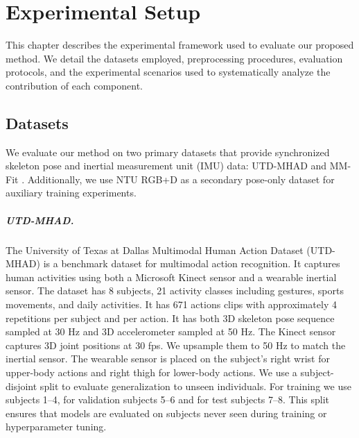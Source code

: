 \chapter{Experimental Setup}
\label{chap:experimental-setup}
{\renewcommand{\thefootnote}{}}

This chapter describes the experimental framework used to evaluate our proposed method. We detail the datasets employed, preprocessing procedures, evaluation protocols, and the experimental scenarios used to systematically analyze the contribution of each component.

\section{Datasets}
\label{sec:datasets}

We evaluate our method on two primary datasets that provide synchronized skeleton pose and inertial measurement unit (IMU) data: UTD-MHAD \cite{chen2015utd} and MM-Fit \cite{stromback2020mm}. Additionally, we use NTU RGB+D \cite{shahroudy2016ntu} as a secondary pose-only dataset for auxiliary training experiments.

\paragraph{UTD-MHAD.}
The University of Texas at Dallas Multimodal Human Action Dataset (UTD-MHAD) \cite{chen2015utd} is a benchmark dataset for multimodal action recognition. It captures human activities using both a Microsoft Kinect sensor and a wearable inertial sensor. The dataset has 8 subjects, 21 activity classes including gestures, sports movements, and daily activities. It has 671 actions clips with approximately 4 repetitions per subject and per action. It has both 3D skeleton pose sequence sampled at 30 Hz and 3D accelerometer sampled at 50 Hz. The Kinect sensor captures 3D joint positions at 30 fps. We upsample them to 50 Hz to match the inertial sensor. The wearable sensor is placed on the subject's right wrist for upper-body actions and right thigh for lower-body actions. We use a subject-disjoint split to evaluate generalization to unseen individuals. For training we use subjects 1--4, for validation subjects 5--6 and for test subjects 7--8. This split ensures that models are evaluated on subjects never seen during training or hyperparameter tuning.

